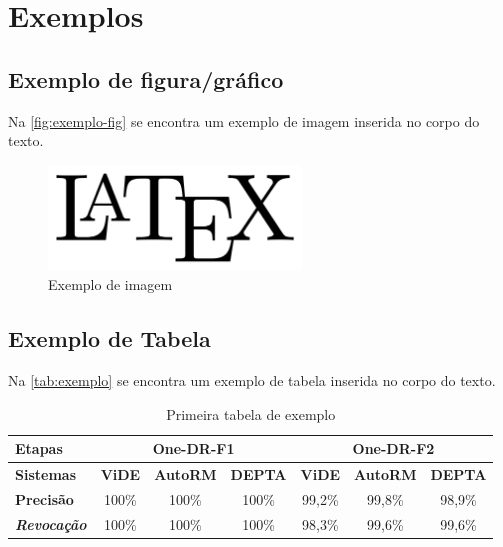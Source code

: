 \chapter{Exemplos}

\section{Exemplo de figura/gráfico}

Na \autoref{fig:exemplo-fig} se encontra um exemplo de imagem inserida no corpo do texto.

\begin{figure} [hbt]
\center
\caption{Exemplo de imagem}
\label{fig:exemplo-fig}
\includegraphics[width=0.6\textwidth]{imagens/LaTeX_logo.png}
\end{figure}

\section{Exemplo de Tabela}

Na \autoref{tab:exemplo} se encontra um exemplo de tabela inserida no corpo do texto.

\begin{table}[hbt]
\centering
\caption{Primeira tabela de exemplo}
\label{tab:exemplo}
\begin{tabular}{lcccccc}
\hline
\multicolumn{1}{l|}{\textbf{Etapas}}   & \multicolumn{3}{c|}{\textbf{One-DR-F1}}                                                                         & \multicolumn{3}{c}{\textbf{One-DR-F2}}                                                                         \\ \hline
\multicolumn{1}{l|}{\textbf{Sistemas}} & \multicolumn{1}{c|}{\textbf{ViDE}} & \multicolumn{1}{c|}{\textbf{AutoRM}} & \multicolumn{1}{c|}{\textbf{DEPTA}} & \multicolumn{1}{c|}{\textbf{ViDE}} & \multicolumn{1}{c|}{\textbf{AutoRM}} & \multicolumn{1}{c}{\textbf{DEPTA}} \\ \hline
\textbf{Precisão}& 100\%   & 100\%   & 100\%   & 99,2\%   & 99,8\%   & 98,9\%   \\
\textit{\textbf{Revocação}}& 100\%   & 100\%   & 100\%   & 98,3\%   & 99,6\%   &99,6\%   \\ \hline
\end{tabular}
\end{table}

